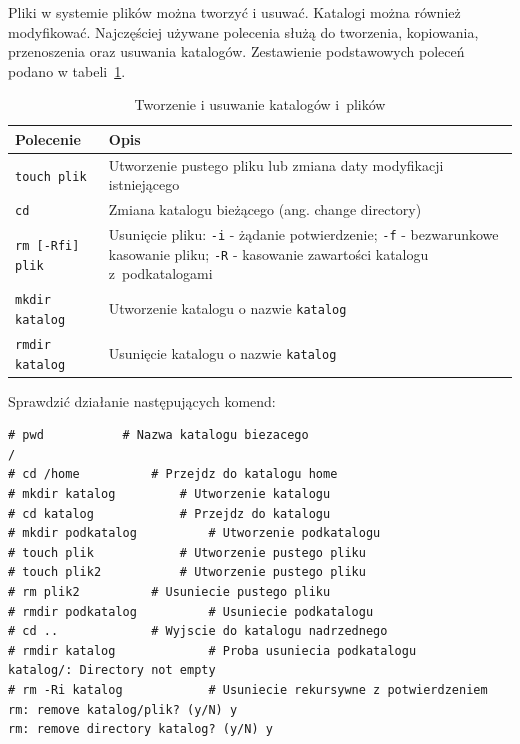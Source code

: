 \begin{example}

Pliki w systemie plików można tworzyć i usuwać. Katalogi można również modyfikować. Najczęściej używane polecenia służą do tworzenia, kopiowania, przenoszenia oraz usuwania katalogów. Zestawienie podstawowych poleceń podano w tabeli~\ref{tab:tworziusun}.

\begin{table}[h!]
\centering
\caption{Tworzenie i usuwanie katalogów i~plików}
\setlength{\arrayrulewidth}{1pt}
\setlength{\tabcolsep}{6pt}
\renewcommand{\arraystretch}{1.2}
\begin{tabular}{ |p{}|p{}|}
\hline \rowcolor{gray}
\textbf{Polecenie} & \textbf{Opis} \\ \hline
\mbox{\lstinline[style=MyBashStyle]{touch plik}} & Utworzenie pustego pliku lub zmiana daty modyfikacji istniejącego \\ \hline 
\mbox{\lstinline[style=MyBashStyle]{cd}}  & Zmiana katalogu bieżącego (ang. change directory) \\ \hline
\mbox{\lstinline[style=MyBashStyle]{rm [-Rfi] plik}} & Usunięcie pliku: \mbox{\lstinline[style=MyBashStyle]{-i}} - żądanie potwierdzenie; \mbox{\lstinline[style=MyBashStyle]{-f}} - bezwarunkowe kasowanie pliku; \mbox{\lstinline[style=MyBashStyle]{-R}} - kasowanie zawartości katalogu z~podkatalogami  \\ \hline 
\mbox{\lstinline[style=MyBashStyle]{mkdir katalog}} & Utworzenie katalogu o nazwie \mbox{\lstinline[style=MyBashStyle]{katalog}} \\ \hline 
\mbox{\lstinline[style=MyBashStyle]{rmdir katalog}} &	Usunięcie katalogu o nazwie \mbox{\lstinline[style=MyBashStyle]{katalog}}  \\ \hline 
\end{tabular}
\label{tab:tworziusun}
\end{table}

Sprawdzić działanie następujących komend: 

\begin{lstlisting}[style=MyBashStyle]
# pwd			# Nazwa katalogu biezacego 
/
# cd /home			# Przejdz do katalogu home
# mkdir katalog			# Utworzenie katalogu
# cd katalog			# Przejdz do katalogu
# mkdir podkatalog			# Utworzenie podkatalogu
# touch plik			# Utworzenie pustego pliku
# touch plik2			# Utworzenie pustego pliku
# rm plik2			# Usuniecie pustego pliku
# rmdir podkatalog			# Usuniecie podkatalogu
# cd .. 			# Wyjscie do katalogu nadrzednego 
# rmdir katalog 			# Proba usuniecia podkatalogu
katalog/: Directory not empty 
# rm -Ri katalog			# Usuniecie rekursywne z potwierdzeniem
rm: remove katalog/plik? (y/N) y
rm: remove directory katalog? (y/N) y
\end{lstlisting}

\end{example}


